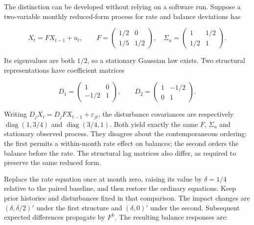 The distinction can be developed without relying on a software run.
Suppose a two-variable monthly reduced-form process for rate and balance
deviations has

\[
 X_t=FX_{t-1}+u_t,\qquad
 F=\begin{pmatrix}1/2&0\\1/5&1/2\end{pmatrix},\quad
 \Sigma_u=\begin{pmatrix}1&1/2\\1/2&1\end{pmatrix}.
\]

Its eigenvalues are both \(1/2\), so a stationary Gaussian law exists.
Two structural representations have coefficient matrices

\[
 D_1=\begin{pmatrix}1&0\\-1/2&1\end{pmatrix},\qquad
 D_2=\begin{pmatrix}1&-1/2\\0&1\end{pmatrix}.
\]

Writing \(D_jX_t=D_jFX_{t-1}+\varepsilon_{jt}\), the disturbance
covariances are respectively \(\operatorname{diag}(1,3/4)\) and
\(\operatorname{diag}(3/4,1)\). Both yield exactly the same \(F\),
\(\Sigma_u\) and stationary observed process. They disagree about the
contemporaneous ordering: the first permits a within-month rate effect
on balances; the second orders the balance before the rate. The
structural lag matrices also differ, as required to preserve the same
reduced form.

Replace the rate equation once at month zero, raising its value by
\(\delta=1/4\) relative to the paired baseline, and then restore the
ordinary equations. Keep prior histories and disturbances fixed in that
comparison. The impact changes are \((\delta,\delta/2)'\) under the
first structure and \((\delta,0)'\) under the second. Subsequent
expected differences propagate by \(F^h\). The resulting balance
responses are:

